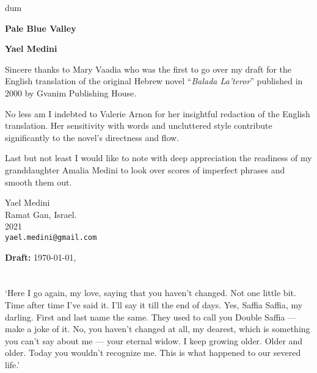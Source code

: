 \documentclass[twoside,11pt,openany]{book}
\begin{document}
\thispagestyle{empty}
{\nullfont dum}
\vspace{.02\textheight}
\begin{center}
{\Huge \textbf{Pale Blue Valley}}

\bigskip

\textbf{\Large Yael Medini}
\end{center}
\vspace{.1\textheight}

Sincere thanks to Mary Vaadia who was the first to go over my draft
for the English translation of the original Hebrew novel ``\emph{Balada La'teror}''
published in 2000 by Gvanim Publishing House.

\bigskip
No less am I indebted to Valerie Arnon for her insightful redaction of
the English translation. Her sensitivity with words and uncluttered
style contribute significantly to the novel's directness and flow.

\bigskip
Last but not least I would like to note with deep appreciation the
readiness of my granddaughter Amalia Medini to look over scores of
imperfect phrases and smooth them out.


\bigskip
{
\parindent=0pt
Yael Medini\\
Ramat Gan, Israel. \\
2021 \\
\texttt{yael.medini@gmail.com}
}

\ifdefined\ymdhms
 \bigskip
 \textbf{Draft:}  \today, \currenttime
\fi



\chapter{}

`Here I go again,
my love,{ saying that you haven't changed. Not one little
bit}. Time after time I've said it. I'll say it
till the end of days. Yes, Saffia Saffia, my darling. First and last name the same. They used to call you Double
Saffia --- make a joke of it. No,
you {haven't
changed }at all, my dearest, which is something you can't say about
me --- your
eternal widow. I keep growing older. Older and older.
Today you wouldn't recognize me. This is what happened to our
severed life.'
\end{document}
